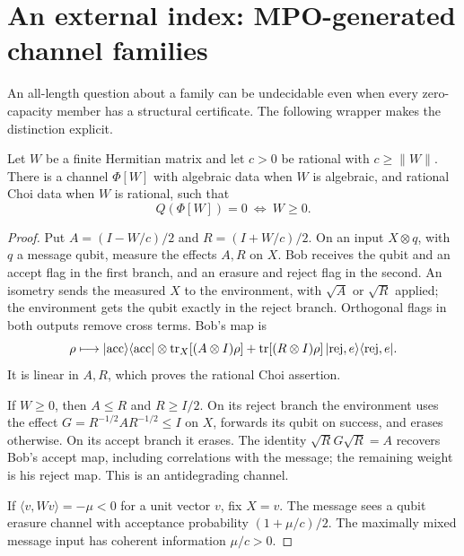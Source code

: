 \section{An external index: MPO-generated channel families}\label{sec:mpo}
An all-length question about a family can be undecidable even when every
zero-capacity member has a structural certificate. The following wrapper
makes the distinction explicit.

\begin{proposition}\label{prop:wrapper}
Let $W$ be a finite Hermitian matrix and let $c>0$ be rational with
$c\geq\|W\|$. There is a channel $\Phi[W]$ with algebraic data when $W$
is algebraic, and rational Choi data when $W$ is rational, such that
\[
 Q(\Phi[W])=0\ \Longleftrightarrow\ W\geq0.
\]
\end{proposition}
\begin{proof}
Put $A=(I-W/c)/2$ and $R=(I+W/c)/2$. On an input $X\otimes q$, with
$q$ a message qubit, measure the effects $A,R$ on $X$. Bob receives
the qubit and an accept flag in the first branch, and an erasure and
reject flag in the second. An isometry sends the measured $X$ to the
environment, with $\sqrt A$ or $\sqrt R$ applied; the environment gets
the qubit exactly in the reject branch. Orthogonal flags in both outputs
remove cross terms. Bob's map is
\[
 \rho\longmapsto
 |\mathrm{acc}\rangle\langle\mathrm{acc}|\otimes
       \operatorname{tr}_X[(A\otimes I)\rho]
 +\operatorname{tr}[(R\otimes I)\rho]\,
       |\mathrm{rej},e\rangle\langle\mathrm{rej},e|.
\]
It is linear in $A,R$, which proves the rational Choi assertion.

If $W\geq0$, then $A\leq R$ and $R\geq I/2$. On its reject branch
the environment uses the effect $G=R^{-1/2}AR^{-1/2}\leq I$ on $X$,
forwards its qubit on success, and erases otherwise. On its accept
branch it erases. The identity $\sqrt R G\sqrt R=A$ recovers Bob's
accept map, including correlations with the message; the remaining
weight is his reject map. This is an antidegrading channel.

If $\langle v,Wv\rangle=-\mu<0$ for a unit vector $v$, fix $X=v$.
The message sees a qubit erasure channel with acceptance probability
$(1+\mu/c)/2$. The maximally mixed message input has coherent information
$\mu/c>0$.
\end{proof}


